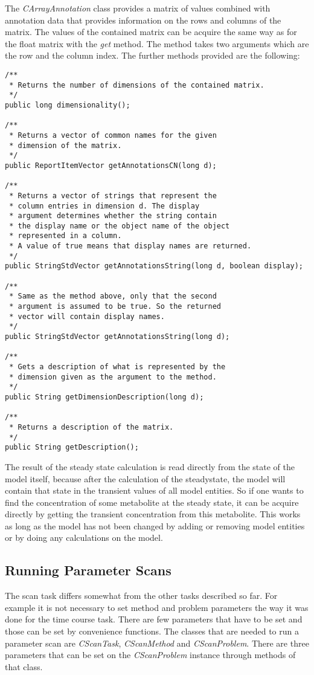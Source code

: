 \documentclass[a4,10pt]{article}
\begin{document}
The \textit{CArrayAnnotation} class provides a matrix of values combined with annotation data that provides information on the rows and columns of the matrix.
The values of the contained matrix can be acquire the same way as for the float matrix with the \textit{get} method. The method takes two arguments which are the row and the column index.
The further methods provided are the following:

\begin{lstlisting}
/**
 * Returns the number of dimensions of the contained matrix.
 */
public long dimensionality();

/**
 * Returns a vector of common names for the given 
 * dimension of the matrix.
 */
public ReportItemVector getAnnotationsCN(long d);

/**
 * Returns a vector of strings that represent the 
 * column entries in dimension d. The display
 * argument determines whether the string contain
 * the display name or the object name of the object 
 * represented in a column.
 * A value of true means that display names are returned.
 */
public StringStdVector getAnnotationsString(long d, boolean display);

/**
 * Same as the method above, only that the second
 * argument is assumed to be true. So the returned
 * vector will contain display names.
 */
public StringStdVector getAnnotationsString(long d);

/**
 * Gets a description of what is represented by the 
 * dimension given as the argument to the method.
 */  
public String getDimensionDescription(long d);

/**
 * Returns a description of the matrix.
 */
public String getDescription();
\end{lstlisting}

The result of the steady state calculation is read directly from the state of the model itself, because after the calculation of the steadystate, the model will contain that state in the transient values of all model entities. So if one wants to find the concentration of some metabolite at the steady state, it can be acquire directly by getting the transient concentration from this metabolite.
This works as long as the model has not been changed by adding or removing model entities or by doing any calculations on the model.


\subsection{Running Parameter Scans}
The scan task differs somewhat from the other tasks described so far. For example it is not necessary to set method and problem parameters the way it was done for the time course task.
There are few parameters that have to be set and those can be set by convenience functions.
The classes that are needed to run a parameter scan are \textit{CScanTask}, \textit{CScanMethod} and \textit{CScanProblem}.
There are three parameters that can be set on the \textit{CScanProblem} instance through methods of that class.
\end{document}

